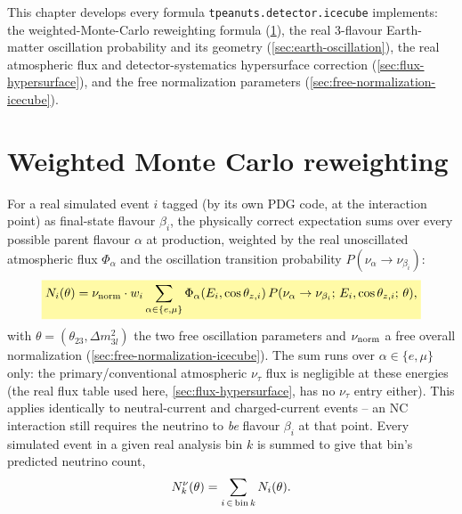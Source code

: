 \label{ch:detector-implementation}

This chapter develops every formula \texttt{tpeanuts.detector.icecube}
implements: the weighted-Monte-Carlo reweighting formula
(\cref{sec:reweighting}), the real 3-flavour Earth-matter oscillation
probability and its geometry (\cref{sec:earth-oscillation}), the real
atmospheric flux and detector-systematics hypersurface correction
(\cref{sec:flux-hypersurface}), and the free normalization parameters
(\cref{sec:free-normalization-icecube}).

\section{Weighted Monte Carlo reweighting}
\label{sec:reweighting}


\begin{theorybox}
For a real simulated event $i$ tagged (by its own PDG code, at the
interaction point) as final-state flavour $\beta_i$, the physically
correct expectation sums over every possible parent flavour $\alpha$ at
production, weighted by the real unoscillated atmospheric flux
$\Phi_\alpha$ and the oscillation transition probability
$P(\nu_\alpha\to\nu_{\beta_i})$:
\begin{equation}
  \keyresult{N_i(\theta) = \nu_{\rm norm}\cdot w_i \sum_{\alpha\in\{e,\mu\}}
    \Phi_\alpha(E_i,\cos\theta_{z,i})\,
    P(\nu_\alpha\to\nu_{\beta_i};\,E_i,\cos\theta_{z,i};\,\theta),}
  \label{eq:reweighting}
\end{equation}
with $\theta=(\theta_{23},\Delta m^2_{3l})$ the two free oscillation
parameters and $\nu_{\rm norm}$ a free overall normalization
(\cref{sec:free-normalization-icecube}). The sum runs over
$\alpha\in\{e,\mu\}$ only: the primary/conventional atmospheric
$\nu_\tau$ flux is negligible at these energies (the real flux table used
here, \cref{sec:flux-hypersurface}, has no $\nu_\tau$ entry either).
This applies identically to neutral-current and charged-current events --
an NC interaction still requires the neutrino to \emph{be} flavour
$\beta_i$ at that point. Every simulated event in a given real analysis
bin $k$ is summed to give that bin's predicted neutrino count,
\begin{equation}
  N_k^\nu(\theta) = \sum_{i\,\in\,{\rm bin}\,k} N_i(\theta).
  \label{eq:bin-sum}
\end{equation}
\end{theorybox}

